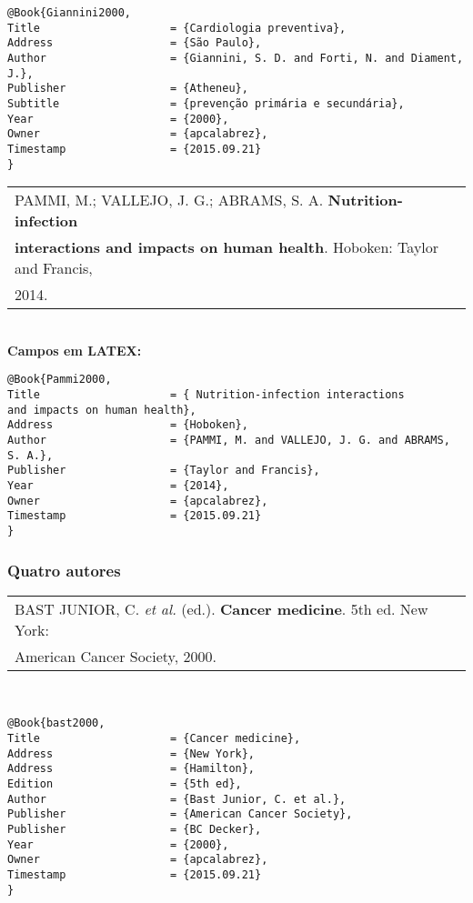 \begin{verbatim}
@Book{Giannini2000,
Title                    = {Cardiologia preventiva},
Address                  = {São Paulo},
Author                   = {Giannini, S. D. and Forti, N. and Diament, 
J.},
Publisher                = {Atheneu},
Subtitle                 = {prevenção primária e secundária},
Year                     = {2000},
Owner                    = {apcalabrez},
Timestamp                = {2015.09.21}
}
\end{verbatim}

\begin{tabular}{|l|c|} \hline
PAMMI, M.; VALLEJO, J. G.; ABRAMS, S. A. \textbf{Nutrition-infection} \\ \textbf{interactions and impacts on human health}. Hoboken: Taylor and Francis, \\ 2014. \\\hline
\end{tabular}\\

\textbf{Campos em LATEX:}

\begin{verbatim}
@Book{Pammi2000,
Title                    = { Nutrition-infection interactions
and impacts on human health},
Address                  = {Hoboken},
Author                   = {PAMMI, M. and VALLEJO, J. G. and ABRAMS, 
S. A.},
Publisher                = {Taylor and Francis},
Year                     = {2014},
Owner                    = {apcalabrez},
Timestamp                = {2015.09.21}
}
\end{verbatim}

\subsubsection{Quatro autores}

\begin{tabular}{|l|c|} \hline
BAST JUNIOR, C. \textit{et al.} (ed.). \textbf{Cancer medicine}. 
5th ed.	New York: \\ American Cancer Society, 2000. 
\\\hline
\end{tabular}\\

\begin{verbatim}
@Book{bast2000,
Title                    = {Cancer medicine},
Address                  = {New York},
Address                  = {Hamilton},
Edition                  = {5th ed},
Author                   = {Bast Junior, C. et al.},
Publisher                = {American Cancer Society},
Publisher                = {BC Decker},
Year                     = {2000},
Owner                    = {apcalabrez},
Timestamp                = {2015.09.21}
}
\end{verbatim}

